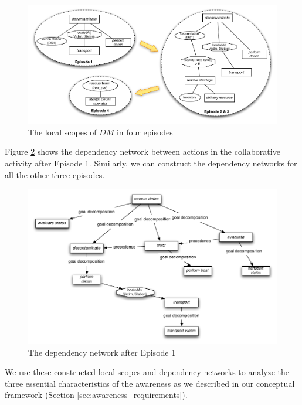\begin{figure}[htbp] %
	\centering
	\includegraphics[width=5.8in]{local_scopes_dm.pdf} 
	\caption{The local scopes of $DM$ in four episodes}
	\label{fig:local_scopes_dm}
\end{figure}

Figure \ref{fig:dependencies_ep1} shows the dependency network between actions in the collaborative activity after Episode 1. Similarly, we can construct the dependency networks for all the other three episodes.

\begin{figure}[htbp] %
	\centering
	\includegraphics[width=5.8in]{dependencies_ep1.pdf} 
	\caption{The dependency network after Episode 1}
	\label{fig:dependencies_ep1}
\end{figure}

We use these constructed local scopes and dependency networks to analyze the three essential characteristics of the awareness as we described in our conceptual framework (Section \ref{sec:awareness_requirements}).  

